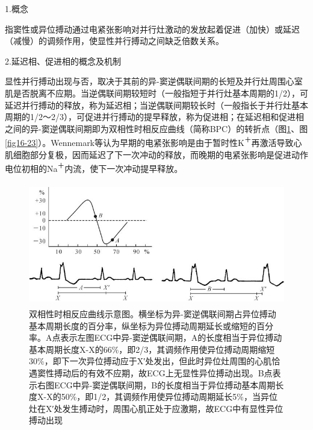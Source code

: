 1.概念

指窦性或异位搏动通过电紧张影响对并行灶激动的发放起着促进（加快）或延迟（减慢）的调频作用，使显性并行搏动之间缺乏倍数关系。

2.延迟相、促进相的概念及机制

显性并行搏动出现与否，取决于其前的异-窦逆偶联间期的长短及并行灶周围心室肌是否脱离不应期。当逆偶联间期较短时（一般指短于并行灶基本周期的1/2），可延迟并行搏动的释放，称为延迟相；当逆偶联间期较长时（一般指长于并行灶基本周期的1/2～2/3），可促进并行搏动的提早释放，称为促进相；在延迟相和促进相之间的异-窦逆偶联间期即为双相性时相反应曲线（简称BPC）的转折点（图\ref{fig16-22}、图\ref{fig16-23}）。Wennemark等认为早期的电紧张影响是由于暂时性K\textsuperscript{＋}再激活导致心肌细胞部分复极，因而延迟了下一次冲动的释放，而晚期的电紧张影响是促进动作电位初相的Na\textsuperscript{＋}内流，使下一次冲动提早释放。

\begin{figure}[!htbp]
 \centering
 \includegraphics[width=4.73958in,height=2.11458in]{./images/Image00298.jpg}
 \captionsetup{justification=centering}
 \caption{双相性时相反应曲线示意图。横坐标为异-窦逆偶联间期占异位搏动基本周期长度的百分率，纵坐标为异位搏动周期延长或缩短的百分率。A点表示左图ECG中异-窦逆偶联间期，A的长度相当于异位搏动基本周期长度X-X的66\%，即2/3，其调频作用使异位搏动周期缩短30\%，即下一次异位搏动应于X′处发出，但此时异位灶周围的心肌恰遇窦性搏动后的有效不应期，故ECG上无显性异位搏动出现。B点表示右图ECG中异-窦逆偶联间期，B的长度相当于异位搏动基本周期长度X-X的50\%，即1/2，其调频作用使异位搏动周期延长5\%，当异位灶在X′处发生搏动时，周围心肌正处于应激期，故ECG中有显性异位搏动出现}
 \label{fig16-22}
  \end{figure} 

